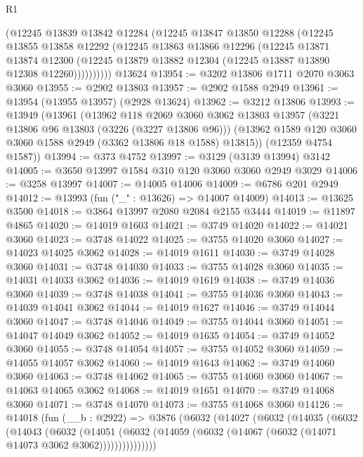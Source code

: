 \begin{lexlean}{R1}
\begin{coremodule}
          (@12245
            @13839
            @13842
            @12284
            (@12245
              @13847
              @13850
              @12288
              (@12245
                @13855
                @13858
                @12292
                (@12245
                  @13863
                  @13866
                  @12296
                  (@12245
                    @13871
                    @13874
                    @12300
                    (@12245 @13879 @13882 @12304 (@12245 @13887 @13890 @12308 @12260))))))))))
    @13624
@13954 := @3202 @13806 @1711 @2070 @3063 @3060
@13955 := @2902 @13803
@13957 := @2902 @1588 @2949
@13961 := @13954 (@13955 @13957) (@2928 @13624)
@13962 := @3212 @13806
@13993 := @13949
    (@13961
      (@13962
        @118
        @2069
        @3060
        @3062
        @13803
        @13957
        (@3221 @13806 @96 @13803 (@3226 (@3227 @13806 @96)))
        (@13962 @1589 @120 @3060 @3060 @1588 @2949 (@3362 @13806 @18 @1588) @13815))
      (@12359 @4754 @1587))
@13994 := @373 @4752
@13997 := @3129 (@3139 @13994) @3142
@14005 := @3650 @13997 @1584 @310 @120 @3060 @3060 @2949 @3029
@14006 := @3258 @13997
@14007 := @14005 @14006
@14009 := @6786 @201 @2949
@14012 := @13993 (fun ("_" : @13626) => @14007 @14009)
@14013 := @13625 @3500
@14018 := @3864 @13997 @2080 @2084 @2155 @3444
@14019 := @11897 @4865
@14020 := @14019 @1603
@14021 := @3749 @14020
@14022 := @14021 @3060
@14023 := @3748 @14022
@14025 := @3755 @14020 @3060
@14027 := @14023 @14025 @3062
@14028 := @14019 @1611
@14030 := @3749 @14028 @3060
@14031 := @3748 @14030
@14033 := @3755 @14028 @3060
@14035 := @14031 @14033 @3062
@14036 := @14019 @1619
@14038 := @3749 @14036 @3060
@14039 := @3748 @14038
@14041 := @3755 @14036 @3060
@14043 := @14039 @14041 @3062
@14044 := @14019 @1627
@14046 := @3749 @14044 @3060
@14047 := @3748 @14046
@14049 := @3755 @14044 @3060
@14051 := @14047 @14049 @3062
@14052 := @14019 @1635
@14054 := @3749 @14052 @3060
@14055 := @3748 @14054
@14057 := @3755 @14052 @3060
@14059 := @14055 @14057 @3062
@14060 := @14019 @1643
@14062 := @3749 @14060 @3060
@14063 := @3748 @14062
@14065 := @3755 @14060 @3060
@14067 := @14063 @14065 @3062
@14068 := @14019 @1651
@14070 := @3749 @14068 @3060
@14071 := @3748 @14070
@14073 := @3755 @14068 @3060
@14126 := @14018
    (fun (__b : @2922) =>
    @3876
      (@6032
        (@14027
          (@6032
            (@14035
              (@6032
                (@14043
                  (@6032
                    (@14051
                      (@6032 (@14059 (@6032 (@14067 (@6032 (@14071 @14073 @3062 @3062)))))))))))))))

\end{coremodule}
\end{lexlean}
